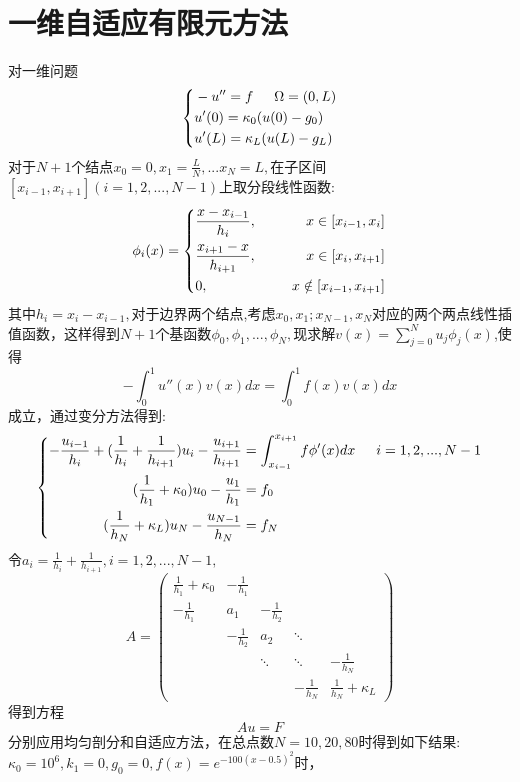 \documentclass[12pt,fontset=mac]{ctexart}
\begin{document}
\section{一维自适应有限元方法}
对一维问题
$$\left\{
\begin{aligned}
&-u'' = f\indent \Omega = (0,L) \\
& u'(0) =\kappa_0(u(0)-g_0) \\
& u'(L) = \kappa_L(u(L)-g_L)\\
\end{aligned}
\right.$$
对于$N+1$个结点$x_0=0,x_1 = \frac{L}{N},...x_N=L,$在子区间$[x_{i-1},x_{i+1}](i=1,2,...,N-1)$上取分段线性函数:
$$\phi_i(x)=\left\{
\begin{aligned}
&\frac{x-x_{i-1}}{h_i},\indent &x\in[x_{i-1},x_i]\\
&\frac{x_{i+1}-x}{h_{i+1}},\indent &x\in [x_i,x_{i+1}] \\
&0,	\indent &x \notin [x_{i-1},x_{i+1}]
\end{aligned}
\right.$$其中$h_i=x_i-x_{i-1},$对于边界两个结点,考虑$x_0,x_1;x_{N-1},x_N$对应的两个两点线性插值函数，这样得到$N+1$个基函数$\phi_0,\phi_1,...,\phi_N,$现求解$v(x)= \sum_{j=0}^{N}u_j\phi_j(x)$,使得
$$ -\int_{0}^{1}u''(x)v(x)dx = \int_{0}^{1}f(x)v(x)dx $$
成立，通过变分方法得到:
$$\left\{
\begin{aligned}
 -\frac{u_{i-1}}{h_i}+(\frac{1}{h_i}+\frac{1}{h_{i+1}})u_i-\frac{u_{i+1}}{h_{i+1}} &= \int_{x_{i-1}}^{x_{i+1}}f\phi'(x)dx \indent i=1,2,...,N-1\\
(\frac{1}{h_1}+\kappa_0)u_0-\frac{u_1}{h_1} &= f_0 \\
(\frac{1}{h_N}+\kappa_L)u_N-\frac{u_{N-1}}{h_N} &= f_N \\
\end{aligned}
\right.
$$
令$a_i = \frac{1}{h_i}+\frac{1}{h_{i+1}},i=1,2,...,N-1,$
$$
A = 
\begin{pmatrix}
\frac{1}{h_1}+\kappa_0 & -\frac{1}{h_1}\\
-\frac{1}{h_1}& a_1& -\frac{1}{h_2} \\
& -\frac{1}{h_2}& a_2 & \ddots \\
& & \ddots & \ddots & -\frac{1}{h_{N}}\\
& & & -\frac{1}{h_{N}} & \frac{1}{h_N}+\kappa_L 
\end{pmatrix}
$$
得到方程$$Au = F$$分别应用均匀剖分和自适应方法，在总点数$N=10,20,80$时得到如下结果:\\
$\kappa_0=10^6,k_1=0,g_0=0,f(x)=e^{-100(x-0.5)^2}$时，\\
\end{document}
